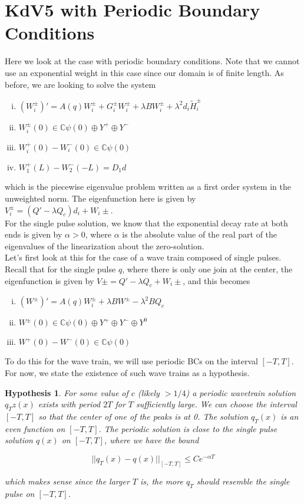 \documentclass[12pt]{article}
\def\C{{\mathbb C}}
\newtheorem{hypothesis}{Hypothesis}
\begin{document}
\section*{KdV5 with Periodic Boundary Conditions}

Here we look at the case with periodic boundary conditions. Note that we cannot use an exponential weight in this case since our domain is of finite length. As before, we are looking to solve the system

\begin{enumerate}[(i)]
\item $(W_i^\pm)' = A(q) W_i^\pm + G_i^\pm W_i^\pm + \lambda B W_i^\pm + \lambda^2 d_i \tilde{H}_i^\pm$
\item $W_i^\pm(0) \in \C \psi(0) \oplus Y^+ \oplus Y^-$
\item $W_i^+(0) - W_i^-(0) \in \C \psi(0) $
\item $W_1^+(L) - W_2^-(-L) = D_1 d $
\end{enumerate}

which is the piecewise eigenvalue problem written as a first order system in the unweighted norm. The eigenfunction here is given by $V_i^\pm = (Q' - \lambda Q_c)d_i + W_i\pm$.\\

For the single pulse solution, we know that the exponential decay rate at both ends is given by $\alpha > 0$, where $\alpha$ is the absolute value of the real part of the eigenvalues of the linearization about the zero-solution.\\

Let's first look at this for the case of a wave train composed of single pulses. Recall that for the single pulse $q$, where there is only one join at the center, the eigenfunction is given by $V\pm = Q' - \lambda Q_c + W_i\pm$, and this becomes

\begin{enumerate}[(i)]
\item $(W^\pm)' = A(q) W_i^\pm + \lambda B W^\pm - \lambda^2 B Q_c$
\item $W^\pm(0) \in \C \psi(0) \oplus Y^+ \oplus Y^- \oplus Y^0$
\item $W^+(0) - W^-(0) \in \C \psi(0) $
\end{enumerate}

To do this for the wave train, we will use periodic BCs on the interval $[-T, T]$. For now, we state the existence of such wave trains as a hypothesis.

\begin{hypothesis}\label{qpexists}
For some value of $c$ (likely $> 1/4$) a periodic wavetrain solution $q_Tz(x)$ exists with period $2T$ for $T$ sufficiently large. We can choose the interval $[-T,T]$ so that the center of one of the peaks is at 0. The solution $q_T(x)$ is an even function on $[-T, T]$. The periodic solution is close to the single pulse solution $q(x)$ on $[-T, T]$, where we have the bound 

\[
||q_T(x) - q(x)||_{[-T, T]} \leq C e^{-\alpha T}
\]

which makes sense since the larger $T$ is, the more $q_T$ should resemble the single pulse on $[-T, T]$.
\end{hypothesis}
\end{document}
